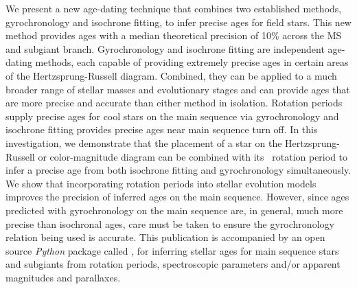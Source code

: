 We present a new age-dating technique that combines two established methods,
gyrochronology and isochrone fitting, to infer precise ages for field stars.
This new method provides ages with a median theoretical precision of 10\%
across the MS and subgiant branch.
Gyrochronology and isochrone fitting are independent age-dating methods, each
capable of providing extremely precise ages in certain areas of the
Hertzsprung-Russell diagram.
Combined, they can be applied to a much broader range of stellar masses and
evolutionary stages and can provide ages that are more precise and accurate
than either method in isolation.
Rotation periods supply precise ages for cool stars on the main sequence via
gyrochronology and isochrone fitting provides precise ages near main sequence
turn off.
In this investigation, we demonstrate that the placement of a star on the
Hertzsprung-Russell or color-magnitude diagram
can be combined with its \kepler\ rotation period to infer a precise age from
both isochrone fitting and gyrochronology simultaneously.
We show that incorporating rotation periods into stellar evolution models
improves the precision of inferred ages on the main sequence.
However, since ages predicted with gyrochronology on the main sequence are, in
general, much more precise than isochronal ages, care must be taken to ensure
the gyrochronology relation being used is accurate.
This publication is accompanied by an open source {\it Python} package called
\sd, for inferring stellar ages for main sequence stars and subgiants from
rotation periods, spectroscopic parameters and/or apparent magnitudes and
parallaxes.

